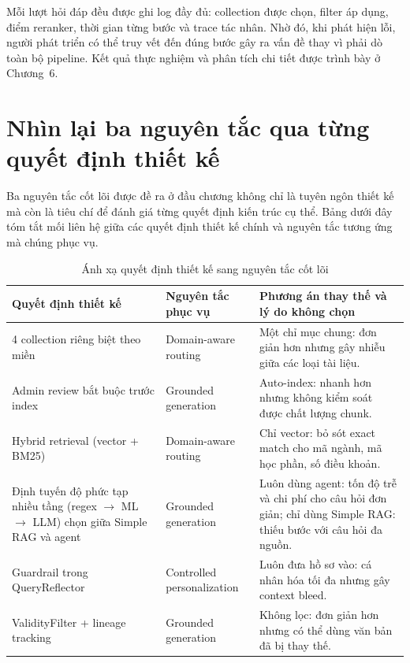 \documentclass[../DoAn.tex]{subfiles}
\begin{document}
Mỗi lượt hỏi đáp đều được ghi log đầy đủ: collection được chọn, filter áp dụng,
điểm reranker, thời gian từng bước và trace tác nhân. Nhờ đó, khi phát hiện lỗi,
người phát triển có thể truy vết đến đúng bước gây ra vấn đề thay vì phải dò
toàn bộ pipeline. Kết quả thực nghiệm và phân tích chi tiết được trình bày ở
Chương~6.

\section{Nhìn lại ba nguyên tắc qua từng quyết định thiết kế}

Ba nguyên tắc cốt lõi được đề ra ở đầu chương không chỉ là tuyên ngôn thiết kế
mà còn là tiêu chí để đánh giá từng quyết định kiến trúc cụ thể. Bảng dưới đây
tóm tắt mối liên hệ giữa các quyết định thiết kế chính và nguyên tắc tương ứng
mà chúng phục vụ.

\begin{table}[H]
\centering
\small
\begin{tabular}{|p{4.2cm}|p{3.8cm}|p{5.6cm}|}
\hline
\textbf{Quyết định thiết kế} & \textbf{Nguyên tắc phục vụ} & \textbf{Phương án
thay thế và lý do không chọn} \\
\hline
4 collection riêng biệt theo miền & Domain-aware routing & Một chỉ mục chung:
đơn giản hơn nhưng gây nhiễu giữa các loại tài liệu. \\
\hline
Admin review bắt buộc trước index & Grounded generation & Auto-index: nhanh hơn
nhưng không kiểm soát được chất lượng chunk. \\
\hline
Hybrid retrieval (vector + BM25) & Domain-aware routing & Chỉ vector: bỏ sót
exact match cho mã ngành, mã học phần, số điều khoản. \\
\hline
Định tuyến độ phức tạp nhiều tầng (regex $\to$ ML $\to$ LLM) chọn giữa Simple
RAG và agent & Grounded generation & Luôn dùng agent: tốn độ trễ và chi phí cho
câu hỏi đơn giản; chỉ dùng Simple RAG: thiếu bước với câu hỏi đa nguồn. \\
\hline
Guardrail trong QueryReflector & Controlled personalization & Luôn đưa hồ sơ
vào: cá nhân hóa tối đa nhưng gây context bleed. \\
\hline
ValidityFilter + lineage tracking & Grounded generation & Không lọc: đơn giản
hơn nhưng có thể dùng văn bản đã bị thay thế. \\
\hline
\end{tabular}
\caption{Ánh xạ quyết định thiết kế sang nguyên tắc cốt lõi}
\label{tab:ch3-design-decisions}
\end{table}
\end{document}
